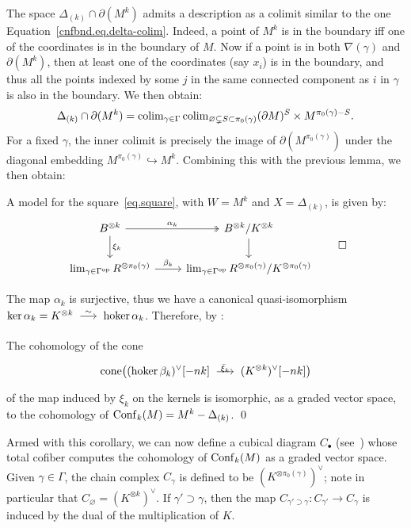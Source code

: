The space $\Delta_{(k)} \cap \partial(M^{k})$ admits a description as a colimit similar to the one Equation~\ref{cnfbnd.eq.delta-colim}.
Indeed, a point of $M^{k}$ is in the boundary iff one of the coordinates is in the boundary of $M$.
Now if a point is in both $\nabla(\gamma)$ and $\partial(M^{k})$, then at least one of the coordinates (say $x_{i}$) is in the boundary, and thus all the points indexed by some $j$ in the same connected component as $i$ in $\gamma$ is also in the boundary.
We then obtain:
\begin{equation}
  \Delta_{(k)} \cap \partial(M^{k}) = \operatorname{colim}_{\gamma \in \Gamma} \operatorname{colim}_{\varnothing \subsetneq S \subset \pi_{0}(\gamma)} (\partial M)^{S} \times M^{\pi_0(\gamma) - S}.
\end{equation}
For a fixed $\gamma$, the inner colimit is precisely the image of $\partial(M^{\pi_{0}(\gamma)})$ under the diagonal embedding $M^{\pi_{0}(\gamma)} \hookrightarrow M^{k}$.
Combining this with the previous lemma, we then obtain:

\begin{proposition}
  A model for the square~\eqref{eq.square}, with $W = M^{k}$ and $X = \Delta_{(k)}$, is given by:
  \[ \begin{tikzcd}
      B^{\otimes k} \ar[r, two heads, "\alpha_{k}"] \ar[d, "\xi_{k}"] & B^{\otimes k} / K^{\otimes k} \ar[d] \\
      \lim_{\gamma \in \Gamma^{\mathrm{op}}} R^{\otimes \pi_{0}(\gamma)} \ar[r, "\beta_{k}"] & \lim_{\gamma \in \Gamma^{\mathrm{op}}} R^{\otimes \pi_{0}(\gamma)} / K^{\otimes \pi_{0}(\gamma)}
    \end{tikzcd}
    \qed \]
\end{proposition}

The map $\alpha_{k}$ is surjective, thus we have a canonical quasi-isomorphism $\ker \alpha_{k} = K^{\otimes k} \qiso \hoker \alpha_{k}$.
Therefore, by \cite[Proposition~3.1]{CordovaBulensLambrechtsStanley2015a}:
\begin{corollary}
  \label{cnfbnd.cor.cone-cohom}
  The cohomology of the cone
  \[ \cone \bigl( (\hoker \beta_{k})^{\vee}[-nk] \tkrightarrow{\bar{\xi}_{k}} (K^{\otimes k})^{\vee}[-nk] \bigr) \]
  of the map induced by $\xi_{k}$ on the kernels is isomorphic, as a graded vector space, to the cohomology of $\operatorname{Conf}_{k}(M) = M^{k} - \Delta_{(k)}$.
  \qed
\end{corollary}

Armed with this corollary, we can now define a cubical diagram $C_{\bullet}$ (see~\cite[Section~7]{LambrechtsStanley2008a}) whose total cofiber computes the cohomology of $\operatorname{Conf}_{k}(M)$ as a graded vector space.
Given $\gamma \in \Gamma$, the chain complex $C_{\gamma}$ is defined to be $(K^{\otimes \pi_{0}(\gamma)})^{\vee}$; note in particular that $C_{\varnothing} = (K^{\otimes k})^{\vee}$.
If $\gamma' \supset \gamma$, then the map $C_{\gamma' \supset \gamma} : C_{\gamma'} \to C_{\gamma}$ is induced by the dual of the multiplication of $K$.


